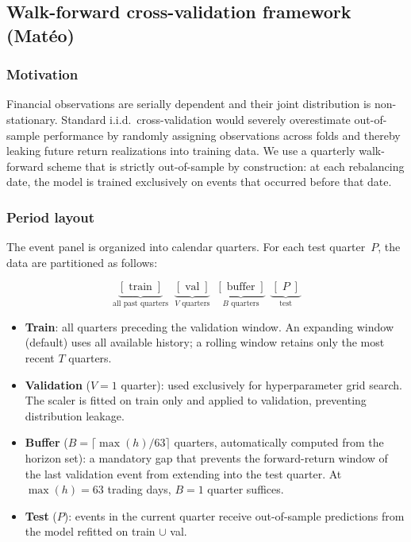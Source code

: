 \documentclass{article}
\begin{document}
\subsection{Walk-forward cross-validation framework (Matéo)}
\label{sec:wfcv}

\subsubsection{Motivation}

Financial observations are serially dependent and their joint distribution is non-stationary. Standard i.i.d.\ cross-validation would severely overestimate out-of-sample performance by randomly assigning observations across folds and thereby leaking future return realizations into training data. We use a quarterly walk-forward scheme that is strictly out-of-sample by construction: at each rebalancing date, the model is trained exclusively on events that occurred before that date.

\subsubsection{Period layout}

The event panel is organized into calendar quarters. For each test quarter~$P$, the data are partitioned as follows:

\begin{equation}
\underbrace{[\;\text{train}\;]}_{\text{all past quarters}} \;\;
\underbrace{[\;\text{val}\;]}_{V \text{ quarters}} \;\;
\underbrace{[\;\text{buffer}\;]}_{B \text{ quarters}} \;\;
\underbrace{[\;P\;]}_{\text{test}}
\end{equation}

\begin{itemize}
  \item \textbf{Train}: all quarters preceding the validation window. An expanding window (default) uses all available history; a rolling window retains only the most recent $T$ quarters.
  \item \textbf{Validation} ($V = 1$ quarter): used exclusively for hyperparameter grid search. The scaler is fitted on train only and applied to validation, preventing distribution leakage.
  \item \textbf{Buffer} ($B = \lceil \max(h) / 63 \rceil$ quarters, automatically computed from the horizon set): a mandatory gap that prevents the forward-return window of the last validation event from extending into the test quarter. At $\max(h) = 63$ trading days, $B = 1$ quarter suffices.
  \item \textbf{Test} ($P$): events in the current quarter receive out-of-sample predictions from the model refitted on train $\cup$ val.
\end{itemize}
\end{document}
